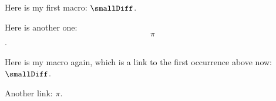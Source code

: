 \documentclass[english]{article}%
\begin{document}
Here is my first macro: $\smallDiff$.

Here is another one: \[\pi\].

\newpage

Here is my macro again, which is a link to the first occurrence above now: $\smallDiff$.

Another link: $\pi$.

\renewcommand{\nomname}{My list of Symbols}

\printnomenclature 
\end{document}
